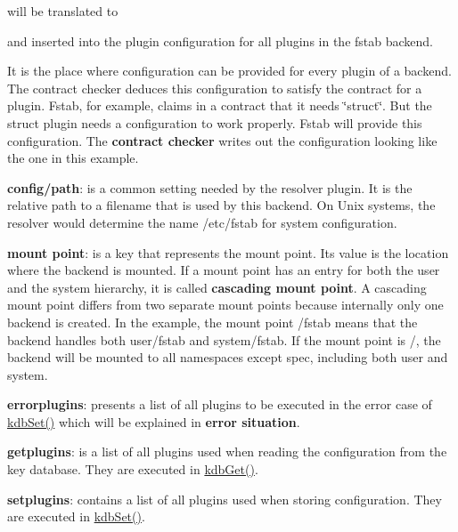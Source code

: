\begin{DoxyCode}{0}
\end{DoxyCode}


will be translated to


\begin{DoxyCode}{0}
\end{DoxyCode}


and inserted into the plugin configuration for all plugins in the {\ttfamily fstab} backend.

It is the place where configuration can be provided for every plugin of a backend. The contract checker deduces this configuration to satisfy the contract for a plugin. Fstab, for example, claims in a contract that it needs \char`\"{}struct\char`\"{}. But the struct plugin needs a configuration to work properly. Fstab will provide this configuration. The {\bfseries{contract checker}} writes out the configuration looking like the one in this example.


\begin{DoxyItemize}
\item {\bfseries{config/path}}\+: is a common setting needed by the resolver plugin. It is the relative path to a filename that is used by this backend. On Unix systems, the resolver would determine the name {\ttfamily /etc/fstab} for system configuration.
\item {\bfseries{mount point}}\+: is a key that represents the mount point. Its value is the location where the backend is mounted. If a mount point has an entry for both the user and the system hierarchy, it is called {\bfseries{cascading mount point}}. A cascading mount point differs from two separate mount points because internally only one backend is created. In the example, the mount point {\ttfamily /fstab} means that the backend handles both {\ttfamily user/fstab} and {\ttfamily system/fstab}. If the mount point is {\ttfamily /}, the backend will be mounted to all namespaces except {\ttfamily spec}, including both {\ttfamily user} and {\ttfamily system}.
\item {\bfseries{errorplugins}}\+: presents a list of all plugins to be executed in the error case of {\ttfamily \mbox{\hyperlink{group__kdb_ga11436b058408f83d303ca5e996832bcf}{kdb\+Set()}}} which will be explained in {\bfseries{error situation}}.
\item {\bfseries{getplugins}}\+: is a list of all plugins used when reading the configuration from the key database. They are executed in {\ttfamily \mbox{\hyperlink{group__kdb_ga28e385fd9cb7ccfe0b2f1ed2f62453a1}{kdb\+Get()}}}.
\item {\bfseries{setplugins}}\+: contains a list of all plugins used when storing configuration. They are executed in {\ttfamily \mbox{\hyperlink{group__kdb_ga11436b058408f83d303ca5e996832bcf}{kdb\+Set()}}}.
\end{DoxyItemize}

